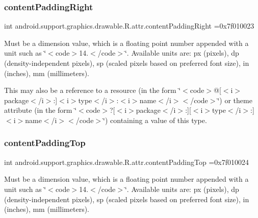 \subsubsection{\texorpdfstring{content\+Padding\+Right}{contentPaddingRight}}
{\footnotesize\ttfamily int android.\+support.\+graphics.\+drawable.\+R.\+attr.\+content\+Padding\+Right =0x7f010023\hspace{0.3cm}{\ttfamily [static]}}

Must be a dimension value, which is a floating point number appended with a unit such as \char`\"{}$<$code$>$14.\+5sp$<$/code$>$\char`\"{}. Available units are\+: px (pixels), dp (density-\/independent pixels), sp (scaled pixels based on preferred font size), in (inches), mm (millimeters). 

This may also be a reference to a resource (in the form \char`\"{}$<$code$>$@\mbox{[}$<$i$>$package$<$/i$>$\+:\mbox{]}$<$i$>$type$<$/i$>$\+:$<$i$>$name$<$/i$>$$<$/code$>$\char`\"{}) or theme attribute (in the form \char`\"{}$<$code$>$?\mbox{[}$<$i$>$package$<$/i$>$\+:\mbox{]}\mbox{[}$<$i$>$type$<$/i$>$\+:\mbox{]}$<$i$>$name$<$/i$>$$<$/code$>$\char`\"{}) containing a value of this type. \mbox{\label{classandroid_1_1support_1_1graphics_1_1drawable_1_1R_1_1attr_a4f6565167b2206aecfb2f26f04d89ce1}} 
\subsubsection{\texorpdfstring{content\+Padding\+Top}{contentPaddingTop}}
{\footnotesize\ttfamily int android.\+support.\+graphics.\+drawable.\+R.\+attr.\+content\+Padding\+Top =0x7f010024\hspace{0.3cm}{\ttfamily [static]}}

Must be a dimension value, which is a floating point number appended with a unit such as \char`\"{}$<$code$>$14.\+5sp$<$/code$>$\char`\"{}. Available units are\+: px (pixels), dp (density-\/independent pixels), sp (scaled pixels based on preferred font size), in (inches), mm (millimeters). 

